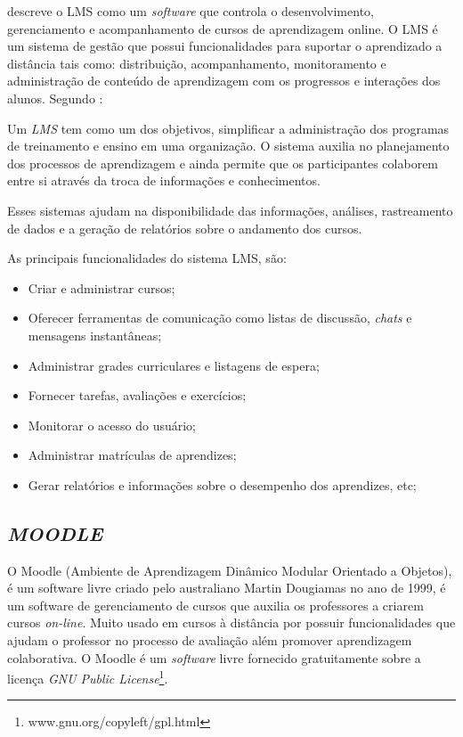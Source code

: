  descreve o \ac{LMS} como um \textit{software} que controla o desenvolvimento, gerenciamento e acompanhamento de cursos de aprendizagem online. O \ac{LMS} é um sistema de gestão que possui funcionalidades para suportar o aprendizado a distância tais como: distribuição, acompanhamento, monitoramento e administração de conteúdo de aprendizagem com os progressos e interações dos alunos.
Segundo :
\begin{citacao}
  Um \textit{LMS} tem como um dos objetivos, simplificar a administração dos programas de treinamento e ensino em uma organização. O sistema auxilia no planejamento dos processos de aprendizagem e ainda permite que os participantes colaborem entre si através da troca de informações e conhecimentos.
\end{citacao}

Esses sistemas ajudam na disponibilidade das informações, análises, rastreamento de dados e a geração de relatórios sobre o andamento dos cursos.

As principais funcionalidades do sistema \ac{LMS}, são:
\begin{itemize}
  \item Criar e administrar cursos;
  \item Oferecer ferramentas de comunicação como listas de discussão, \textit{chats} e mensagens instantâneas;
  \item Administrar grades curriculares e listagens de espera;
  \item Fornecer tarefas, avaliações e exercícios;
  \item Monitorar o acesso do usuário;
  \item Administrar matrículas de aprendizes;
  \item Gerar relatórios e informações sobre o desempenho dos aprendizes, etc;
\end{itemize}

\subsection{\textit{MOODLE}}
O \ac{Moodle} (Ambiente de Aprendizagem Dinâmico Modular Orientado a Objetos), é um software livre criado pelo australiano Martin Dougiamas no ano de 1999, é um software de gerenciamento de cursos que auxilia os professores a criarem cursos \textit{on-line}. Muito usado em cursos à distância por possuir funcionalidades que ajudam o professor no processo de avaliação além promover aprendizagem colaborativa. O \ac{Moodle} é um \textit{software} livre fornecido gratuitamente sobre a licença \textit{GNU Public License}\footnote{www.gnu.org/copyleft/gpl.html}. \cite{moodle}


